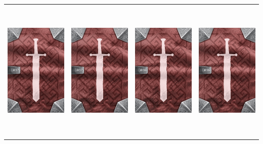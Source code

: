 \documentclass{minimal}
\begin{document}
{\begin{longtable}{llll}
\includegraphics[width=44mm,height=68mm]{./15-21/gh-017-empowering-talisman-back.png} &
\includegraphics[width=44mm,height=68mm]{./15-21/gh-017-empowering-talisman-back.png} &
\includegraphics[width=44mm,height=68mm]{./15-21/gh-016-cloak-of-pockets-back.png} &
\includegraphics[width=44mm,height=68mm]{./15-21/gh-016-cloak-of-pockets-back.png}\\ 

\end{longtable}}
\end{document}

